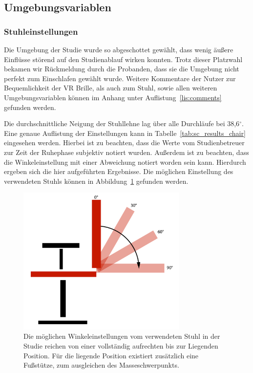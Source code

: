 \subsection{Umgebungsvariablen}
\subsubsection{Stuhleinstellungen}

Die Umgebung der Studie wurde so abgeschottet gewählt, dass wenig äußere Einflüsse störend auf den Studienablauf wirken konnten. Trotz dieser Platzwahl bekamen wir Rückmeldung durch die Probanden, dass sie die Umgebung nicht perfekt zum Einschlafen gewählt wurde. Weitere Kommentare der Nutzer zur Bequemlichkeit der VR Brille, als auch zum Stuhl, sowie allen weiteren Umgebungsvariablen können im Anhang unter Auflistung~\ref{lis:comments} gefunden werden.

Die durchschnittliche Neigung der Stuhllehne lag über alle Durchläufe bei 38,6$^\circ$. Eine genaue Auflistung der Einstellungen kann in Tabelle~\ref{tab:sc_results_chair} eingesehen werden. Hierbei ist zu beachten, dass die Werte vom Studienbetreuer zur Zeit der Ruhephase subjektiv notiert wurden. Außerdem ist zu beachten, dass die Winkeleinstellung mit einer Abweichung notiert worden sein kann. Hierdurch ergeben sich die hier aufgeführten Ergebnisse. Die möglichen Einstellung des verwendeten Stuhls können in Abbildung~\ref{fig:chair_backrest} gefunden werden.

\begin{figure}[H]
	\centering
	\includegraphics[width=0.75\textwidth]{./images/chair}
	\caption{Die möglichen Winkeleinstellungen vom verwendeten Stuhl in der Studie reichen von einer vollständig aufrechten bis zur Liegenden Position. Für die liegende Position existiert zusätzlich eine Fußstütze, zum ausgleichen des Masseschwerpunkts.}
	\label{fig:chair_backrest}
\end{figure}

